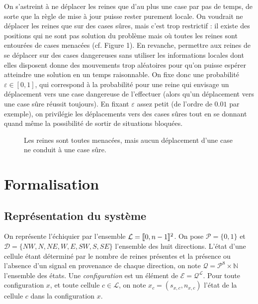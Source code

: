 \documentclass[11pt, openany]{article}
\newcommand{\cg }{[\kern-0.15em [}
\newcommand{\cd}{]\kern-0.15em]}
\newcommand{\N}{\mathbb{N}}
\newcommand{\La}{\mathcal{L}}
\newcommand{\D}{\mathcal{D}}
\newcommand{\E}{\mathcal{E}}
\begin{document}
On s'astreint à ne déplacer les reines que d'au plus une case par pas de temps, de sorte que la règle de mise à jour puisse rester purement locale. On voudrait ne déplacer les reines que sur des cases sûres, mais c'est trop restrictif : il existe des positions qui ne sont pas solution du problème mais où toutes les reines sont entourées de cases menacées (cf. Figure 1). En revanche, permettre aux reines de se déplacer sur des cases dangereuses sans utiliser les informations locales dont elles disposent donne des mouvements trop aléatoires pour qu'on puisse espérer atteindre une solution en un temps raisonnable. On fixe donc une probabilité $\varepsilon \in [0,1]$, qui correspond à la probabilité pour une reine qui envisage un déplacement vers une case dangereuse de l'effectuer (alors qu'un déplacement vers une case sûre réussit toujours). En fixant $\varepsilon$ assez petit (de l'ordre de $0.01$ par exemple), on privilégie les déplacements vers des cases sûres tout en se donnant quand même la possibilité de sortir de situations bloquées.


\begin{figure}
\centering

\newgame
{}
\notationoff
\showboard
\caption{Les reines sont toutes menacées, mais aucun déplacement d'une case ne conduit à une case sûre.}
\end{figure}

\section*{Formalisation}

\subsection*{Représentation du système}

\noindent
On représente l'échiquier par l'ensemble $\La = \cg 0, n-1\cd^2$. On pose $\mathcal{P} = \{0,1\}$ et $\D = \{NW,N,NE,W,E,SW,S,SE\}$ l'ensemble des huit directions. L'état d'une cellule étant déterminé par le nombre de reines présentes et la présence ou l'absence d'un signal en provenance de chaque direction, on note $\mathcal{Q} = {\mathcal{P}^8}\times\N$ l'ensemble des états. Une \emph{configuration} est un élément de $\E=\mathcal{Q}^\La$. Pour toute configuration $x$, et toute cellule $c \in \La$, on note $x_c = (s_{x, c}, n_{x, c})$ l'état de la cellule $c$ dans la configuration $x$. 
\end{document}
